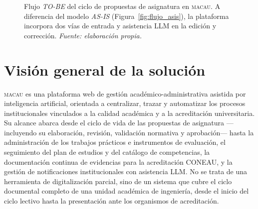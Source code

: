 \begin{figure}[H]
{%
}%
\caption{Flujo \textit{TO-BE} del ciclo de propuestas de asignatura en \textsc{macau}.
  A diferencia del modelo \textit{AS-IS} (Figura~\ref{fig:flujo_asis}), la plataforma
  incorpora dos v\'ias de entrada y asistencia LLM en la edici\'on y correcci\'on.
  \textit{Fuente: elaboraci\'on propia.}}
\label{fig:flujo_tobe}
\end{figure}

\section{Visión general de la solución}
\label{sec:vision_general}

\textsc{macau} es una plataforma web de gestión académico-administrativa asistida por inteligencia
artificial, orientada a centralizar, trazar y automatizar los procesos institucionales
vinculados a la calidad académica y a la acreditación universitaria.
Su alcance abarca desde el ciclo de vida de las propuestas de asignatura ---incluyendo
su elaboración, revisión, validación normativa y aprobación--- hasta la administración
de los trabajos prácticos e instrumentos de evaluación, el seguimiento del plan de
estudios y del catálogo de competencias, la documentación continua de evidencias para
la acreditación CONEAU, y la gestión de notificaciones institucionales con asistencia LLM.
No se trata de una herramienta de digitalización parcial, sino de un sistema que cubre
el ciclo documental completo de una unidad académica de ingeniería, desde el inicio
del ciclo lectivo hasta la presentación ante los organismos de acreditación.

